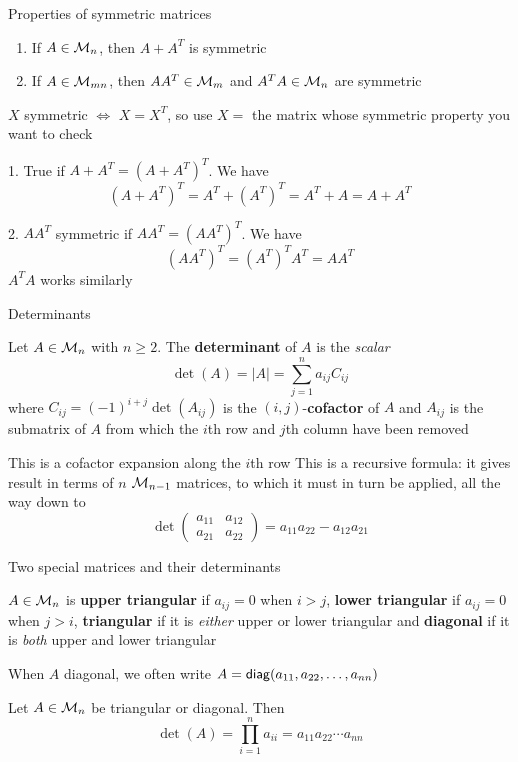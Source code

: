 \documentclass[aspectratio=169]{beamer}\usepackage[]{graphicx}\usepackage[]{xcolor}
\begin{document}
\begin{frame}{Properties of symmetric matrices}
\begin{theorem}
\begin{enumerate}
	\item If $A\in\mathcal{M}_n$, then $A+A^T$ is symmetric
	\item If $A\in\mathcal{M}_{mn}$, then $AA^T\in\mathcal{M}_m$ and $A^TA\in\mathcal{M}_n$ are symmetric
\end{enumerate}
\end{theorem}
\vfill
$X$ symmetric $\iff$ $X=X^T$, so use $X=$ the matrix whose symmetric property you want to check

1. True if $A+A^T=(A+A^T)^T$. We have 
\[
(A+A^T)^T=A^T+(A^T)^T=A^T+A=A+A^T
\]

2. $AA^T$ symmetric if $AA^T=(AA^T)^T$. We have 
\[
(AA^T)^T=(A^T)^TA^T=AA^T
\]
$A^TA$ works similarly
\end{frame}

\begin{frame}{Determinants}
\begin{definition}[Determinant]
Let $A\in\mathcal{M}_n$ with $n\geq 2$. The \textbf{determinant} of $A$ is the \emph{scalar}
\[
\det(A)=|A|=\sum_{j=1}^na_{ij}C_{ij}
\]
where $C_{ij}=(-1)^{i+j}\det(A_{ij})$ is the $(i,j)$-\textbf{cofactor} of $A$ and $A_{ij}$ is the submatrix of $A$ from which the $i$th row and $j$th column have been removed
\end{definition}
This is a cofactor expansion along the $i$th row
\vfill
This is a recursive formula: it gives result in terms of $n$ $\mathcal{M}_{n-1}$ matrices, to which it must in turn be applied, all the way down to
\[
\det\left(
\begin{matrix}
a_{11} & a_{12} \\ a_{21} & a_{22}
\end{matrix}\right) = a_{11}a_{22}-a_{12}a_{21}
\]
\end{frame}

\begin{frame}{Two special matrices and their determinants}
\begin{definition}
$A\in\mathcal{M}_n$ is \textbf{upper triangular} if $a_{ij}=0$ when $i>j$, \textbf{lower triangular} if $a_{ij}=0$ when $j>i$, \textbf{triangular} if it is \emph{either} upper or lower triangular and \textbf{diagonal} if it is \emph{both} upper and lower triangular
\end{definition}
When $A$ diagonal, we often write $A=\mathsf{diag}(a_{11},a_{22},\ldots,a_{nn})$
\begin{importanttheorem}
Let $A\in\mathcal{M}_n$ be triangular or diagonal. Then
\[
\det(A)=\prod_{i=1}^n a_{ii}=a_{11}a_{22}\cdots a_{nn}
\]
\end{importanttheorem}
\end{frame}
\end{document}
